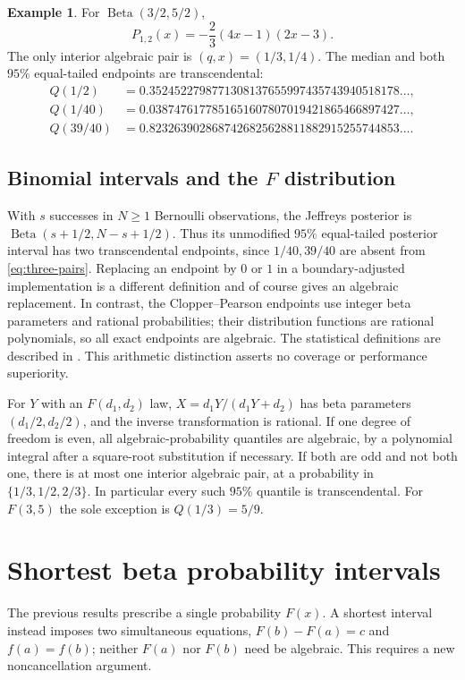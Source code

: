\documentclass[11pt,a4paper]{article}
\numberwithin{equation}{section}
\theoremstyle{definition}
\newtheorem{example}[theorem]{Example}
\theoremstyle{remark}
\begin{document}
\begin{example}
For $\operatorname{Beta}(3/2,5/2)$,
\[
 P_{1,2}(x)=-\frac23(4x-1)(2x-3).
\]
The only interior algebraic pair is $(q,x)=(1/3,1/4)$. The median and
both $95\%$ equal-tailed endpoints are transcendental:
\begin{align*}
 Q(1/2)&=0.3524522798771308137655997435743940518178\ldots,\\
 Q(1/40)&=0.0387476177851651607807019421865466897427\ldots,\\
 Q(39/40)&=0.8232639028687426825628811882915255744853\ldots.
\end{align*}
\end{example}

\subsection{Binomial intervals and the \texorpdfstring{$F$}{F} distribution}
With $s$ successes in $N\ge1$ Bernoulli observations, the Jeffreys posterior
is $\operatorname{Beta}(s+1/2,N-s+1/2)$. Thus its unmodified $95\%$
equal-tailed posterior interval has two transcendental endpoints, since
$1/40,39/40$ are absent from \eqref{eq:three-pairs}. Replacing an endpoint
by $0$ or $1$ in a boundary-adjusted implementation is a different definition
and of course gives an algebraic replacement. In contrast, the
Clopper--Pearson endpoints use integer beta parameters and rational
probabilities; their distribution functions are rational polynomials, so
all exact endpoints are algebraic. The statistical definitions are described
in \cite{Ratesci}. This arithmetic distinction asserts no coverage or
performance superiority.

For $Y$ with an $F(d_1,d_2)$ law,
$X=d_1Y/(d_1Y+d_2)$ has beta parameters $(d_1/2,d_2/2)$, and the inverse
transformation is rational. If one degree of freedom is even, all
algebraic-probability quantiles are algebraic, by a polynomial integral after
a square-root substitution if necessary. If both are odd and not both one,
there is at most one interior algebraic pair, at a probability in
$\{1/3,1/2,2/3\}$. In particular every such $95\%$ quantile is
transcendental. For $F(3,5)$ the sole exception is $Q(1/3)=5/9$.

\section{Shortest beta probability intervals}\label{sec:hpd}
The previous results prescribe a single probability $F(x)$. A shortest
interval instead imposes two simultaneous equations,
$F(b)-F(a)=c$ and $f(a)=f(b)$; neither $F(a)$ nor $F(b)$ need be algebraic.
This requires a new noncancellation argument.
\end{document}
